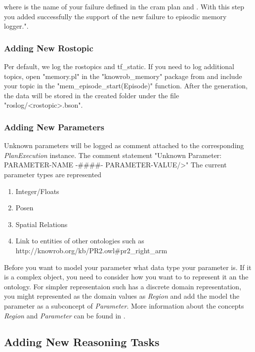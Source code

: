 where  is the name of your failure defined in the cram plan and .
With this step you added successfully the support of the new failure to \cram \neem episodic memory logger.".	

\subsubsection{Adding New Rostopic}
Per default, we log the rostopics \tf and tf\_static.
If you need to log additional topics, open "memory.pl" in the "knowrob\_memory" package from \knowrob and include your topic in the "mem\_episode\_start(Episode)" function.
After the \neem generation, the data will be stored in the created \neem folder under the file "roslog/<rostopic>.bson".

\subsubsection{Adding New Parameters}
Unknown parameters will be logged as comment attached to the corresponding \textit{PlanExecution} instance.
The comment statement "Unknown Parameter: PARAMETER-NAME  -\#\#\#\#- PARAMETER-VALUE/>"
The current parameter types are represented 


\begin{enumerate} 
	\item Integer/Floats
	\item Posen
	\item Spatial Relations
	\item Link to entities of other ontologies such as http://knowrob.org/kb/PR2.owl\#pr2\_right\_arm
\end{enumerate}

Before you want to model your parameter what data type your parameter is.
If it is a complex object, you need to consider how you want to to represent it an the ontology.
For simpler representaion such has a discrete domain representation, you might represented as the domain values as \textit{Region} and add the model the parameter as a subconcept of \textit{Parameter}.
More information about the concepts \textit{Region} and \textit{Parameter} can be found in .


\subsection{Adding New Reasoning Tasks}



